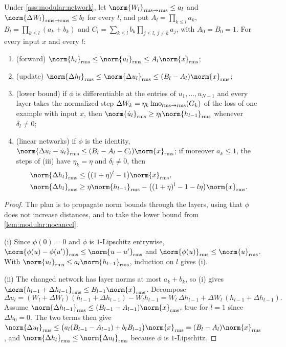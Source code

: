 \begin{refsection}
\begin{theorem}\label{thm:modular:spectralcondition}
Under \cref{ass:modular:network}, let $\norm{W_l}_{\rms\to\rms}\le a_l$ and $\norm{\Delta W_l}_{\rms\to\rms}\le b_l$ for every $l$, and put $A_l=\prod_{k\le l}a_k$, $B_l=\prod_{k\le l}(a_k+b_k)$ and $C_l=\sum_{k\le l}b_k\prod_{j\le l,\,j\ne k}a_j$, with $A_0=B_0=1$. For every input $x$ and every $l$:
\begin{enumerate}
\item (forward) $\norm{h_l}_\rms\le\norm{u_l}_\rms\le A_l\norm{x}_\rms$;
\item (update) $\norm{\Delta h_l}_\rms\le\norm{\Delta u_l}_\rms\le(B_l-A_l)\norm{x}_\rms$;
\item (lower bound) if $\phi$ is differentiable at the entries of $u_1,\dots,u_{N-1}$ and every layer takes the normalized step $\Delta W_k=\eta_k\operatorname{lmo}_{\mathrm{rms}\to\mathrm{rms}}(G_k)$ of the loss of one example with input $x$, then $\norm{\dot u_l}_\rms\ge\eta_l\norm{h_{l-1}}_\rms$ whenever $\delta_l\ne0$;
\item (linear networks) if $\phi$ is the identity, $\norm{\Delta u_l-\dot u_l}_\rms\le(B_l-A_l-C_l)\norm{x}_\rms$; if moreover $a_k\le1$, the steps of (iii) have $\eta_k=\eta$ and $\delta_l\ne0$, then
\begin{equation}\label{eq:modular:sandwich}
  \begin{aligned}
  \norm{\Delta h_l}_\rms&\le\bigl((1+\eta)^l-1\bigr)\norm{x}_\rms,\\
  \norm{\Delta h_l}_\rms&\ge\eta\norm{h_{l-1}}_\rms-\bigl((1+\eta)^l-1-l\eta\bigr)\norm{x}_\rms .
  \end{aligned}
\end{equation}
\end{enumerate}
\end{theorem}

\begin{proof}
The plan is to propagate norm bounds through the layers, using that $\phi$ does not increase distances, and to take the lower bound from \cref{lem:modular:nocancel}.

(i) Since $\phi(0)=0$ and $\phi$ is $1$-Lipschitz entrywise, $\norm{\phi(u)-\phi(u')}_\rms\le\norm{u-u'}_\rms$ and $\norm{\phi(u)}_\rms\le\norm{u}_\rms$. With $\norm{u_l}_\rms\le a_l\norm{h_{l-1}}_\rms$, induction on $l$ gives (i).

(ii) The changed network has layer norms at most $a_k+b_k$, so (i) gives $\norm{h_{l-1}+\Delta h_{l-1}}_\rms\le B_{l-1}\norm{x}_\rms$. Decompose
\[
  \Delta u_l=(W_l+\Delta W_l)(h_{l-1}+\Delta h_{l-1})-W_lh_{l-1}=W_l\,\Delta h_{l-1}+\Delta W_l\,(h_{l-1}+\Delta h_{l-1}) .
\]
Assume $\norm{\Delta h_{l-1}}_\rms\le(B_{l-1}-A_{l-1})\norm{x}_\rms$, true for $l=1$ since $\Delta h_0=0$. The two terms then give $\norm{\Delta u_l}_\rms\le\bigl(a_l(B_{l-1}-A_{l-1})+b_lB_{l-1}\bigr)\norm{x}_\rms=(B_l-A_l)\norm{x}_\rms$, and $\norm{\Delta h_l}_\rms\le\norm{\Delta u_l}_\rms$ because $\phi$ is $1$-Lipschitz.


\end{proof}
\end{refsection}
